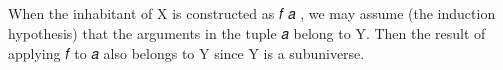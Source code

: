 \begin{code}
\AgdaSpace{}%
\AgdaSpace{}%
\<%
\\
%
\>[2]\AgdaSpace{}%
\AgdaSpace{}%
\AgdaSymbol{=}\AgdaSpace{}%
\AgdaSpace{}%
\AgdaSpace{}%
\AgdaSpace{}%
\AgdaSpace{}%
\AgdaSpace{}%
\AgdaSymbol{(}\AgdaSpace{}%
\AgdaSymbol{)}\<%
\\
%
\\[\AgdaEmptyExtraSkip]%
%
\>[2]\AgdaSpace{}%
\AgdaSymbol{:}\AgdaSpace{}%
\AgdaSymbol{(}\AgdaSpace{}%
\AgdaSpace{}%
\AgdaSymbol{)}\AgdaSpace{}%
\AgdaSpace{}%
\AgdaSpace{}%
\<%
\\
%
\>[2]\AgdaSpace{}%
\AgdaSymbol{=}\AgdaSpace{}%
\AgdaSpace{}%
\AgdaSpace{}%
\AgdaSpace{}%
\<%
\end{code}
\ccpad
When the inhabitant of  \ab X is constructed as  \ab 𝑓 \ab 𝑎 , we may assume (the induction hypothesis) that the arguments in the tuple \ab 𝑎 belong to \ab Y. Then the result of applying \ab 𝑓 to \ab 𝑎 also belongs to \ab Y since \ab Y is a subuniverse.

